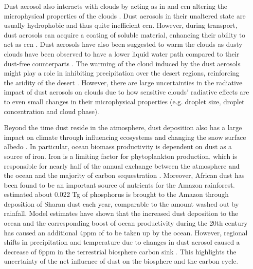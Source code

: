Dust aerosol also interacts with clouds by acting as \acrfull{in} and \acrfull{ccn} altering the microphysical properties of the clouds \parencite{lohmann2006sensitivity}. 
Dust aerosols in their unaltered state are usually hydrophobic and thus quite inefficient \acrshort{ccn}. 
However, during transport, dust aerosols can acquire a coating of soluble material, enhancing their ability to act as \acrshort{ccn} \parencite{Dust_aerosols_coating2001}. 
Dust aerosols have also been suggested to warm the clouds as dusty clouds have been observed to have a lower liquid water path compared to their dust-free counterparts \parencite{huang2006satellite}. 
The warming of the cloud induced by the dust aerosols might play a role in inhibiting precipitation over the desert regions, reinforcing the aridity of the desert \parencite{shao2011dust}.  However, there are large uncertainties in the radiative impact of dust aerosols on clouds due to how sensitive clouds' radiative effects are to even small changes in their microphysical properties (e.g. droplet size, droplet concentration and cloud phase).

Beyond the time dust reside in the atmosphere, dust deposition also has a large impact on climate through influencing ecosystems and changing the snow surface albedo \parencite{mahowald2010observed,shao2011dust,wittmann2017impact}. 
In particular, ocean biomass productivity is dependent on dust as a source of iron. Iron is a limiting factor for phytoplankton production, which is responsible for nearly half of the annual  exchange between the atmosphere and the ocean and the majority of carbon sequestration \parencite{shao2011dust}. Moreover, African dust has been found to be an important source of nutrients for the Amazon rainforest. \textcite{yu2015fertilizing} estimated about 0.022 Tg of phosphorus is brought to the Amazon through deposition of Sharan dust each year, comparable to the amount washed out by rainfall. Model estimates have shown that the increased dust deposition to the ocean and the corresponding boost of ocean productivity during the 20th century has caused an additional 4ppm of  to be taken up by the ocean. However, regional shifts in precipitation and temperature due to changes in dust aerosol caused a decrease of 6ppm  in the terrestrial biosphere carbon sink \parencite{mahowald2010observed}. This highlights the uncertainty of the net influence of dust on the biosphere and the carbon cycle.

